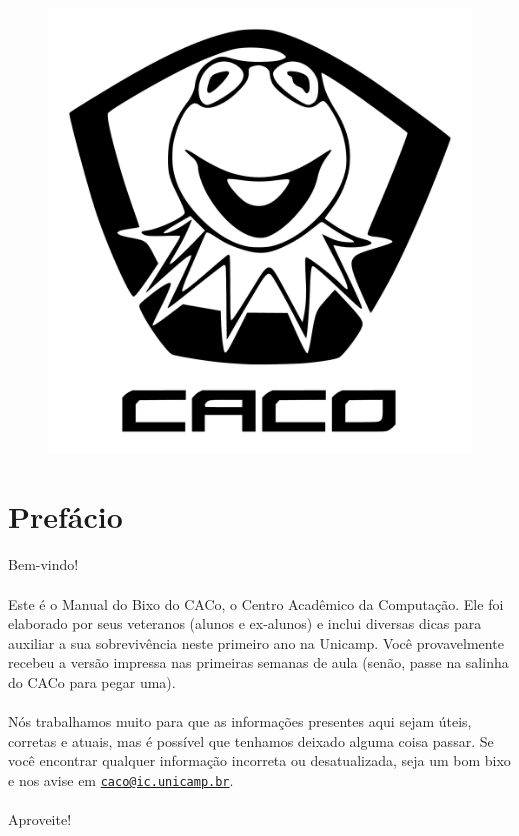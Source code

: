\documentclass[a4paper,10pt,openany]{book}
\newcommand{\email}[1]{\href{mailto:#1}{\nolinkurl{#1}}}
\begin{document}
\begin{figure}[H]
    \centering
    \includegraphics[width=.65\textwidth]{img/caco_logo.pdf}
\end{figure}
\section*{Prefácio}
\paragraph{}
Bem-vindo!

\paragraph{}
Este é o Manual do Bixo do CACo, o Centro Acadêmico da Computação. Ele foi
elaborado por seus veteranos (alunos e ex-alunos) e inclui diversas dicas para
auxiliar a sua sobrevivência neste primeiro ano na Unicamp. Você provavelmente
recebeu a versão impressa nas primeiras semanas de aula (senão, passe na salinha
do CACo para pegar uma).

\paragraph{}
Nós trabalhamos muito para que as informações presentes aqui sejam úteis,
corretas e atuais, mas é possível que tenhamos deixado alguma coisa passar. Se
você encontrar qualquer informação incorreta ou desatualizada, seja um bom bixo
e nos avise em \email{caco@ic.unicamp.br}.

\paragraph{}
Aproveite!
\end{document}

